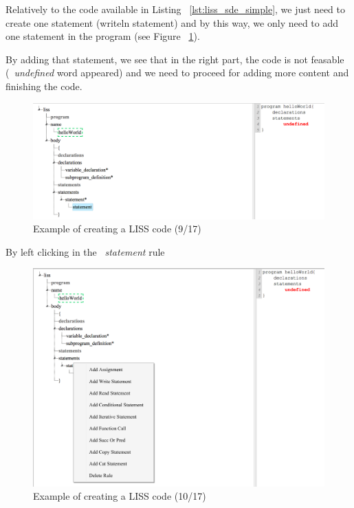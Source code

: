 \documentclass[
  oneside,
  11pt, a4paper,
  footinclude=true,
  headinclude=true,
  cleardoublepage=empty
]{scrbook}
\begin{document}
Relatively to the code available in Listing ~\ref{lst:liss_sde_simple}, we just need to create one statement (writeln statement) and by this way, we only need to add one statement in the program (see Figure ~\ref{fig:LISS-SDE_example_9}).

By adding that statement, we see that in the right part, the code is not feasable (~\textit{undefined} word appeared) and we need to proceed for adding more content and finishing the code.

\begin{figure}[h!]
  \centering
    \includegraphics[width=1\textwidth]{img/LISS-SDE_creating_program/LISS-SDE9.png}
    \caption{Example of creating a LISS code (9/17)}
    \label{fig:LISS-SDE_example_9}
\end{figure}

By left clicking in the ~\textit{statement} rule 

\begin{figure}[h!]
  \centering
    \includegraphics[width=1\textwidth]{img/LISS-SDE_creating_program/LISS-SDE10.png}
    \caption{Example of creating a LISS code (10/17)}
    \label{fig:LISS-SDE_example_10}
\end{figure}
\end{document}
